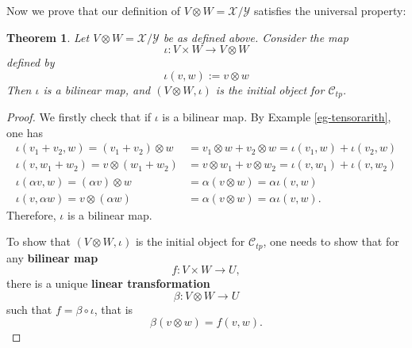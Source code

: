 \documentclass[11pt,openany]{book}
\theoremstyle{plain}
\newtheorem{theorem}{Theorem}[chapter]
\theoremstyle{definition}
\theoremstyle{remark}
\begin{document}
Now we prove that our definition of $V \otimes W = \mathcal{X}/\mathcal{Y}$ satisfies the universal property:
\begin{theorem} Let $V \otimes W = \mathcal{X}/\mathcal{Y}$ be as defined above. Consider the map 
$$\iota : V \times W \to V \otimes W$$ 
defined by
$$\iota(v,w) := v \otimes w$$
Then $\iota$ is a bilinear map, and $(V \otimes W, \iota)$ is the initial object for $\mathcal{C}_{tp}$.
\end{theorem}
\begin{proof}
    We firstly check that if $\iota$ is a bilinear map. By Example \ref{eg-tensorarith}, one has
    \begin{align*}
        \iota(v_1+v_2, w) = (v_1+v_2)\otimes w &= v_1 \otimes w + v_2 \otimes w = \iota(v_1, w) + \iota(v_2, w) \\
        \iota(v, w_1+w_2) = v\otimes (w_1+w_2) &= v \otimes w_1 + v \otimes w_2 = \iota(v, w_1) + \iota(v, w_2) \\
        \iota(\alpha v, w) = (\alpha v)\otimes w &= \alpha (v \otimes w) = \alpha \iota(v, w) \\
        \iota(v, \alpha w) = v\otimes (\alpha w) &= \alpha (v \otimes w) = \alpha \iota(v, w).
    \end{align*}
    Therefore, $\iota$ is a bilinear map.
    
    To show that $(V \otimes W, \iota)$ is the initial object for $\mathcal{C}_{tp}$, one needs to show that for any {\bf bilinear map}
    $$f : V \times W \to U,$$
    there is a unique {\bf linear transformation}
    $$\beta : V \otimes W \to U$$
    such that $f = \beta \circ \iota$, that is
    $$\beta (v \otimes w) = f(v, w).$$


\end{proof}
\end{document}
